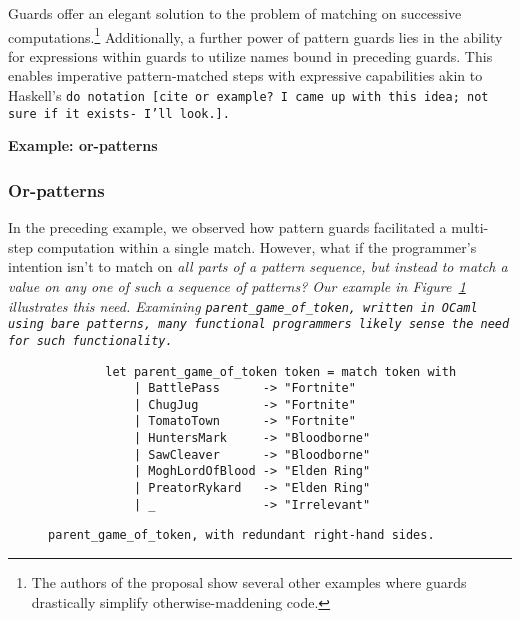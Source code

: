 \documentclass[manuscript,screen,review, 12pt]{acmart}
\begin{document}
\begin{outline}[enumerate]
    Guards offer an elegant solution to the problem of matching on successive
    computations.\footnote{The authors of the proposal show several other
    examples where guards drastically simplify otherwise-maddening code.}
    Additionally, a further power of pattern guards lies in the ability for
    expressions within guards to utilize names bound in preceding guards. This
    enables imperative pattern-matched steps with expressive capabilities akin
    to Haskell's \tt{do} notation [cite or example? I came up with this idea;
    not sure if it exists- I'll look.]. 

        \2 \bf{Example: or-patterns}

\subsubsection{Or-patterns}

        In the preceding example, we observed how pattern guards facilitated a
        multi-step computation within a single match. However, what if the
        programmer's intention isn't to match on \it{all} parts of a pattern
        sequence, but instead to match a value on \it{any one} of such a
        sequence of patterns? Our example in Figure~\ref{fig:barepgot}
        illustrates this need. Examining \tt{parent\_game\_of\_token}, written
        in OCaml using bare patterns, many functional programmers likely sense
        the need for such functionality.
        
        
        \begin{figure}
            \begin{center}
                \begin{verbatim}
        let parent_game_of_token token = match token with 
            | BattlePass      -> "Fortnite"
            | ChugJug         -> "Fortnite"
            | TomatoTown      -> "Fortnite"
            | HuntersMark     -> "Bloodborne"
            | SawCleaver      -> "Bloodborne"
            | MoghLordOfBlood -> "Elden Ring"
            | PreatorRykard   -> "Elden Ring"
            | _               -> "Irrelevant"
                \end{verbatim}
            \end{center}    

        \caption{\tt{parent\_game\_of\_token}, with redundant right-hand sides.} 
        \label{fig:barepgot}
        \end{figure}


\end{outline}
\end{document}
